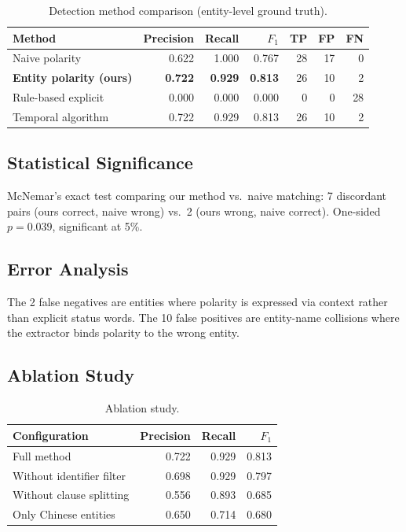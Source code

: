 \documentclass{article}
\begin{document}
\begin{table}[h]
\centering
\caption{Detection method comparison (entity-level ground truth).}
\begin{tabular}{lrrrrrr}
\toprule
Method & Precision & Recall & $F_1$ & TP & FP & FN \\
\midrule
Naive polarity & 0.622 & 1.000 & 0.767 & 28 & 17 & 0 \\
\textbf{Entity polarity (ours)} & \textbf{0.722} & \textbf{0.929} & \textbf{0.813} & 26 & 10 & 2 \\
Rule-based explicit & 0.000 & 0.000 & 0.000 & 0 & 0 & 28 \\
Temporal algorithm & 0.722 & 0.929 & 0.813 & 26 & 10 & 2 \\
\bottomrule
\end{tabular}
\label{tab:results}
\end{table}

\subsection{Statistical Significance}
McNemar's exact test comparing our method vs.\ naive matching: 7 discordant pairs (ours correct, naive wrong) vs.\ 2 (ours wrong, naive correct). One-sided $p = 0.039$, significant at 5\%.

\subsection{Error Analysis}
The 2 false negatives are entities where polarity is expressed via context rather than explicit status words. The 10 false positives are entity-name collisions where the extractor binds polarity to the wrong entity.

\subsection{Ablation Study}

\begin{table}[h]
\centering
\caption{Ablation study.}
\begin{tabular}{lrrr}
\toprule
Configuration & Precision & Recall & $F_1$ \\
\midrule
Full method & 0.722 & 0.929 & 0.813 \\
Without identifier filter & 0.698 & 0.929 & 0.797 \\
Without clause splitting & 0.556 & 0.893 & 0.685 \\
Only Chinese entities & 0.650 & 0.714 & 0.680 \\
\bottomrule
\end{tabular}
\label{tab:ablation}
\end{table}
\end{document}
